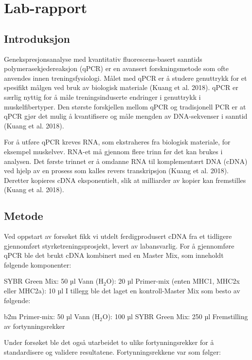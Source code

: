 \documentclass[
  letterpaper,
  DIV=11,
  numbers=noendperiod]{scrreprt}
\begin{document}

\chapter{Lab-rapport}\label{lab-rapport}

\section{Introduksjon}\label{introduksjon-4}

Genekspresjonsanalyse med kvantitativ fluorescens-basert sanntids
polymerasekjedereaksjon (qPCR) er en avansert forskningsmetode som ofte
anvendes innen treningsfysiologi. Målet med qPCR er å studere genuttrykk
for et spesifikt målgen ved bruk av biologisk materiale (Kuang et al.
2018). qPCR er særlig nyttig for å måle treningsinduserte endringer i
genuttrykk i muskelfibertyper. Den største forskjellen mellom qPCR og
tradisjonell PCR er at qPCR gjør det mulig å kvantifisere og måle
mengden av DNA-sekvenser i sanntid (Kuang et al. 2018).

For å utføre qPCR kreves RNA, som ekstraheres fra biologisk materiale,
for eksempel muskelvev. RNA-et må gjennom flere trinn før det kan brukes
i analysen. Det første trinnet er å omdanne RNA til komplementært DNA
(cDNA) ved hjelp av en prosess som kalles revers transkripsjon (Kuang et
al. 2018). Deretter kopieres cDNA eksponentielt, slik at milliarder av
kopier kan fremstilles (Kuang et al. 2018).

\section{Metode}\label{metode-6}

Ved oppstart av forsøket fikk vi utdelt ferdigprodusert cDNA fra et
tidligere gjennomført styrketreningsprosjekt, levert av labansvarlig.
For å gjennomføre qPCR ble det brukt cDNA kombinert med en Master Mix,
som inneholdt følgende komponenter:

SYBR Green Mix: 50 µl Vann (H\(_2\)O): 20 µl Primer-mix (enten MHC1,
MHC2x eller MHC2a): 10 µl I tillegg ble det laget en kontroll-Master Mix
som besto av følgende:

b2m Primer-mix: 50 µl Vann (H\(_2\)O): 100 µl SYBR Green Mix: 250 µl
Fremstilling av fortynningsrekker

Under forsøket ble det også utarbeidet to ulike fortynningsrekker for å
standardisere og validere resultatene. Fortynningsrekkene var som
følger:
\end{document}

